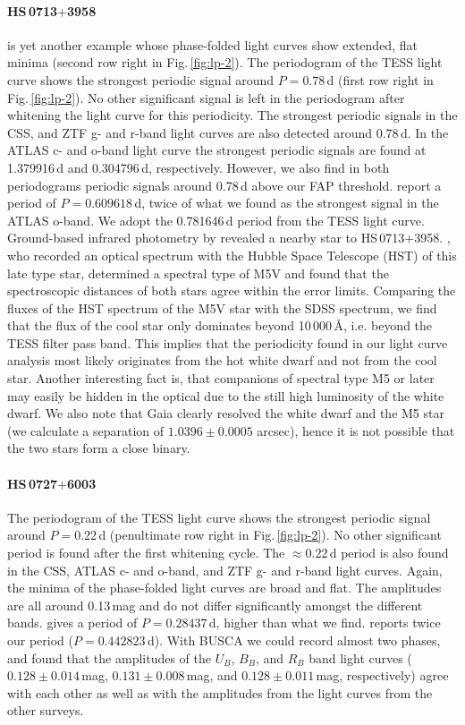 \documentclass{aa}
\newcommand{\fg}[1]{\mbox{Fig.\,\ref{#1}}}
\begin{document}
\paragraph{HS\,0713$+$3958} is yet another example whose phase-folded light
curves show extended, flat minima (second row right in \fg{fig:lp-2}). The
periodogram of the TESS light curve shows the strongest periodic signal around
$P=0.78$\,d (first row right in \fg{fig:lp-2}). No
other significant signal is left in the periodogram after whitening the light
curve for this periodicity. The strongest periodic signals in the CSS, and ZTF
g- and r-band light curves are also detected around 0.78\,d.
In the ATLAS c- and o-band light curve the strongest periodic signals
are found at 1.379916\,d  and 0.304796\,d,
respectively. However, we also find in both periodograms periodic signals
around 0.78\,d above our FAP threshold.
\cite{Heinze+2018} report a period of $P=0.609618$\,d,
twice of what we found as the strongest signal in the ATLAS o-band.
We adopt the 0.781646\,d period from the TESS light curve.\\
Ground-based infrared photometry by \cite{Napiwotzki+1997} revealed a
nearby star to HS\,0713+3958. \cite{Werner+2018a}, who recorded an
optical spectrum with the Hubble Space Telescope (HST) of this late type
star, determined a spectral type of M5V and found that the spectroscopic
distances of both stars agree within the error limits.
Comparing the fluxes of the HST spectrum of the M5V star with the SDSS
spectrum, we find that the flux of the cool star only dominates beyond
10\,000\,\AA, i.e. beyond the TESS filter pass band. This implies that the
periodicity found in our light curve analysis most likely originates
from the hot white dwarf and not from the cool star. Another interesting
fact is, that companions of spectral type M5 or later may easily be
hidden in the optical due to the still high luminosity of the white dwarf.
We also note that Gaia clearly resolved the white dwarf and the M5 star
(we calculate a separation of $1.0396\pm0.0005$ arcsec), hence it is not
possible that the two stars form a close binary.
\paragraph{HS\,0727$+$6003} The periodogram of the TESS light curve shows
the strongest periodic signal around $P=0.22$\,d (penultimate row right
in \fg{fig:lp-2}). No other significant period is
found after the first whitening cycle. The $\approx0.22$\,d period is also
found in the CSS, ATLAS c- and o-band, and ZTF g- and r-band
light curves. Again, the minima of the phase-folded light curves are broad
and flat. The amplitudes are all around 0.13\,mag and do not differ
significantly amongst the different bands. \cite{Drake+2014} gives a period
of $P=0.28437$\,d, higher than what we find. \cite{Heinze+2018} reports
twice our period ($P=0.442823$\,d).
With BUSCA we could record almost two phases, and found that the
amplitudes of the $U_B$, $B_B$, and $R_B$ band light curves ($0.128\pm0.014$\,mag,
$0.131\pm0.008$\,mag, and $0.128\pm0.011$\,mag, respectively) agree with each other as
well as with the amplitudes from the light curves from the other surveys.
\end{document}
